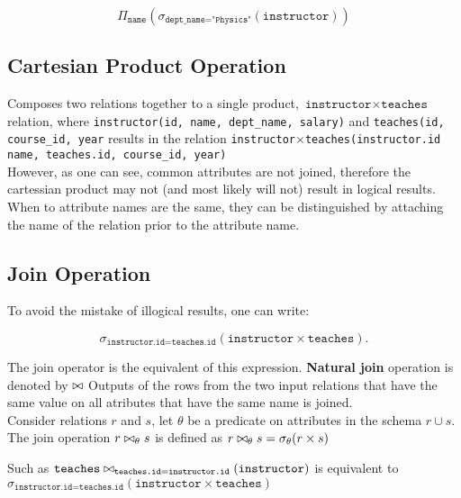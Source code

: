 \documentclass[11pt,a4paper,twocolumn]{book}
\begin{document}
\begin{equation}
\Pi_{\texttt{name}}(\sigma_{\texttt{dept\_name} = \texttt{"Physics"}}(\texttt{instructor}))
\end{equation}

\subsection{Cartesian Product Operation}

Composes two relations together to a single product, $\texttt{instructor} \times \texttt{teaches}$ relation, where \texttt{instructor(id, name, dept\_name, salary)} and \texttt{teaches(id, course\_id, year} results in the relation \texttt{instructor$\times$teaches(instructor.id name, teaches.id, course\_id, year)}\\

However, as one can see, common attributes are not joined, therefore the cartessian product may not (and most likely will not) result in logical results.\\

When to attribute names are the same, they can be distinguished by attaching the name of the relation prior to the attribute name.\\

\subsection{Join Operation}

To avoid the mistake of illogical results, one can write:

\begin{equation}
\sigma_{\texttt{instructor.id}=\texttt{teaches.id}}(\texttt{instructor}\times\texttt{teaches}).
\end{equation}

The join operator is the equivalent of this expression. \textbf{Natural join} operation is denoted by $\bowtie$ Outputs of the rows from the two input relations that have the same value on all atributes that have the same name is joined.\\

Consider relations $r$ and $s$, let $\theta$ be a predicate on attributes in the schema $r \cup s$. The join operation $r \bowtie_\theta s$ is defined as $r \bowtie_\theta s = \sigma_\theta (r \times s)$

Such as $\texttt{teaches} \bowtie_{\texttt{teaches.id} = \texttt{instructor.id}}( \texttt{instructor})$ is equivalent to $\sigma_{\texttt{instructor.id}=\texttt{teaches.id}}(\texttt{instructor} \times \texttt{teaches})$
\end{document}

